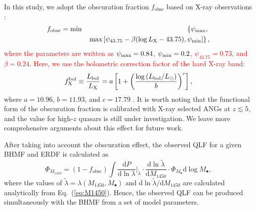 \documentclass[twocolumn, twocolappendix]{aastex63}
\newcommand{\Mbh}{M_\bullet}
\newcommand{\fobsc}{f_\mathrm{obsc}}
\newcommand{\Muv}{M_{1450}}
\newcommand{\Lbol}{L_\mathrm{bol}}
\newcommand{\D}{\mathrm{d}}
\newcommand{\red}[1]{\textcolor{red}{ #1}}
\begin{document}
\begin{CJK*}{UTF8}{gbsn}
In this study, we adopt the obscuration fraction $\fobsc$ based on X-ray observations \citep{2014ApJ...786..104U}:
\red{
%
\begin{eqnarray}
\fobsc & = \text{min} & \left\{ \psi_{\rm max}, \right.  \\ \nonumber 
&   & \left. \text{max}\left[ \psi_{43.75}  - \beta (\log L_{\rm X} -43.75), \psi_{\rm min}     \right]\right\},
\end{eqnarray}
%
where the parameters are written as $\psi_{\rm max}=0.84$, $\psi_{\rm min}=0.2$, $\psi_{43.75}=0.73$, and $\beta=0.24$.
%
Here, we use the bolometric correction factor of the hard X-ray band:}
%
\begin{equation}
  f^{\rm bol}_{\rm X} \equiv \frac{\Lbol}{L_{\rm X}}=
  a\left[1+\left(\frac{\log \left(\Lbol / L_\odot\right)}{b}\right)^{c}\right],
\end{equation}
%
where $a=10.96$, $b = 11.93$, and $c = 17.79$ \citep[see Eq.~2 in][]{2020A&A...636A..73D}. 
It is worth noting that the functional form of the obscuration fraction
is calibrated with X-ray selected ANGs at $z\lesssim 5$,
and the value for high-$z$ quasars is still under investigation.
We leave more comprehensive arguments about this effect for future work.


After taking into account the obscuration effect, 
the observed QLF for a given BHMF and ERDF is calculated as
%
\begin{equation}
\label{eq:dn_dM1450}
\Phi_{\Muv} 
 = (1 -\fobsc)  %
\int \frac{\D P}{\D \ln \lambda}\Big|_{\tilde{\lambda}}  \cdot
\frac{\D \ln \tilde{\lambda}}{\D \Muv} \cdot
 \Phi_{\Mbh} \D \log \Mbh,
\end{equation}
%
where the values of $\tilde{\lambda}=\lambda(\Muv, \Mbh)$ and $\D \ln \tilde{\lambda}/\D \Muv$ are calculated analytically from Eq.~(\ref{eq:M1450}).
%
Hence, the observed QLF can be produced simultaneously with the BHMF from a set of model parameters.





\end{CJK*}
\end{document}
